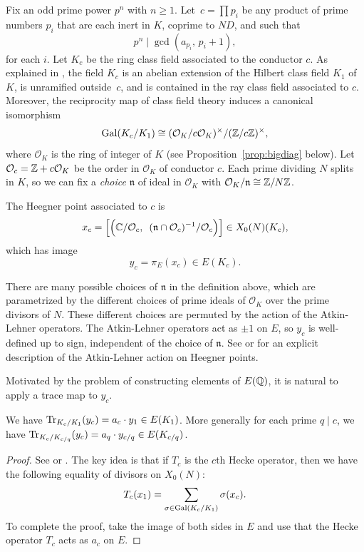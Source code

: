 \documentclass{article} \usepackage[active]{srcltx}
\newcommand{\n}{\mathfrak{n}}
\renewcommand{\O}{\mathcal{O}}
\begin{document}
Fix an odd prime power $p^n$ with $n\geq 1$.  Let~$c=\prod p_i$ be any
product of prime numbers $p_i$ that are each inert in $K$, coprime to
$ND$, and such that
$$
  p^n\mid \gcd(a_{p_i},\, p_i+1),
$$
for each $i$.  Let $K_c$ be the ring class field associated to the
conductor $c$.  As explained in \cite[pg.~238]{gross:kolyvagin}, the
field $K_c$ is an abelian extension of the Hilbert class field $K_1$
of $K$, is unramified outside~$c$, and is contained in the ray class
field associated to $c$.  Moreover, the reciprocity map of class field
theory induces a canonical isomorphism
\begin{equation}\label{eqn:cft} \Gal(K_c/K_1) \isom
(\O_K/c\O_K)^{\times}/(\Z/c\Z)^{\times},
\end{equation} where $\O_K$ is the ring of integer of $K$
(see Proposition~\ref{prop:bigdiag} below).  Let $\O_c
= \Z + c\O_K$ be the order in $\O_K$ of conductor $c$.  Each prime
dividing $N$ splits in $K$, so we can fix a {\em choice} $\n$ of
ideal in $\O_K$ with $\O_K/\n\isom \Z/N\Z$.

The Heegner point associated to $c$ is
$$
x_c = \Bigl[\Bigl(\C/\O_c, \,\,\, (\n\cap\O_c)^{-1}/\O_c \Bigr)
\Bigr] \in X_0(N)(K_c),
$$
which has image
$$
 y_c =\pi_E(x_c) \in E(K_c).
$$

\begin{remark}\label{rmk:welldef} There are many possible choices of
  $\n$ in the definition above, which are parametrized by the
  different choices of prime ideals of $\O_K$ over the prime divisors
  of $N$. These different choices are permuted by the action of the
  Atkin-Lehner operators.  The Atkin-Lehner operators act as $\pm 1$
  on $E$, so $y_c$ is well-defined up to sign, independent of the
  choice of $\n$.  See \cite{watkins:heegner} or \cite[Thm.~8.7.7]{cohen:gtm239} for an explicit
  description of the Atkin-Lehner action on Heegner points.
\end{remark}


Motivated by the problem of constructing elements of $E(\mathbb{Q})$, it is
natural to apply a trace map to $y_c$.

\begin{proposition}\label{prop:dist} We have 
$\operatorname{Tr}_{K_c/K_1}(y_c) = a_c \cdot y_1 \in E(K_1)$.
More generally for each prime $q\mid c$, we have
$\operatorname{Tr}_{K_c/K_{c/q}}(y_c) = a_q \cdot y_{c/q} \in E(K_{c/q})$.
\end{proposition}
\begin{proof} See \cite[\S6]{gross:heegnerX0N} or
  \cite[Lem.~5.2]{jetchev-kane:equi}.  The key idea is that if $T_c$
  is the $c$th Hecke operator, then we have the following equality of
  divisors on $X_0(N)$:
   $$T_c(x_1) = \sum_{\sigma\in \operatorname{Gal}(K_c/K_1)} \sigma(x_c).$$ 
   To complete the proof, take the image of both sides in $E$ and use
   that the Hecke operator $T_c$ acts as $a_c$ on $E$.
\end{proof}
 
\end{document}
